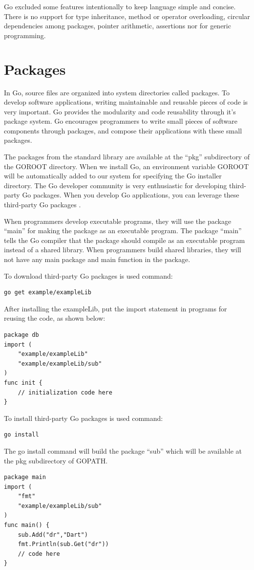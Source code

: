 \documentclass[
  digital, %
  notable,   %
  lof,     %
  lot,     %
]{fithesis3}
\begin{document}
Go excluded some features intentionally to keep language simple and concise. There is no 
support for type inheritance, method or operator overloading, circular dependencies among 
packages, pointer arithmetic, assertions nor for generic programming.

\section{Packages}
In Go, source files are organized into system directories called packages. To  develop 
software applications, writing maintainable and reusable pieces of code is very important. Go 
provides the modularity and code reusability through it’s package system. Go encourages 
programmers to write small pieces of software components through packages, and compose their  
applications with these small packages.

The packages from the standard library are available at the “pkg” subdirectory of the GOROOT 
directory. When we install Go, an environment variable GOROOT will be automatically added to 
our system for specifying the Go installer directory. The Go developer community is very 
enthusiastic for developing third-party Go packages. When you develop Go applications, you can 
leverage these third-party Go packages \cite{stack_2014}.

When programmers develop executable programs, they will use the package “main” for making the 
package as an executable program. The package “main” tells the Go compiler that the package 
should compile as an executable program instead of a shared library. When programmers build 
shared libraries, they will not have any main package and main function in the package.

To download third-party Go packages is used command: 
\begin{lstlisting}
go get example/exampleLib
\end{lstlisting}
After installing the exampleLib, put the import statement in programs for reusing the code, as 
shown below:
\begin{lstlisting}
package db
import (
	"example/exampleLib"
	"example/exampleLib/sub"
)
func init {
	// initialization code here    
}
\end{lstlisting}
To install third-party Go packages is used command: 
\begin{lstlisting}
go install
\end{lstlisting}
The go install command will build the package “sub” which will be available at the pkg 
subdirectory of GOPATH.
\begin{lstlisting}
package main
import (
	"fmt"
	"example/exampleLib/sub"
)
func main() {
    sub.Add("dr","Dart")
    fmt.Println(sub.Get("dr"))
    // code here    
}
\end{lstlisting}
\end{document}
